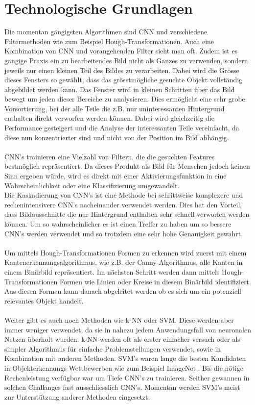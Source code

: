 \section{Technologische Grundlagen}
\label{sec:technicalBase}
Die momentan gängigsten Algorithmen sind \gls{CNN} \parencite{li2015convolutional} und verschiedene Filtermethoden wie zum Beispiel Hough-Transformationen\parencite{ye2015new}. Auch eine Kombination von \gls{CNN} und vorangehenden Filter sieht man oft. Zudem ist es gängige Praxis ein zu bearbeitendes Bild nicht als Ganzes zu verwenden, sondern jeweils nur einen kleinen Teil des Bildes zu verarbeiten. Dabei wird die Grösse dieses Fensters so gewählt, dass das grösstmögliche gesuchte Objekt vollständig abgebildet werden kann. Das Fenster wird in kleinen Schritten über das Bild bewegt um jeden dieser Bereiche zu analysieren. Dies ermöglicht eine sehr grobe Vorsortierung, bei der alle Teile die z.B. nur uninteressanten Hintergrund enthalten direkt verworfen werden können. Dabei wird gleichzeitig die Performance gesteigert und die Analyse der interessanten Teile vereinfacht, da diese nun konzentrierter sind und nicht von der Position im Bild abhängig.\\
\\
\gls{CNN}’s trainieren eine Vielzahl von Filtern, die die gesuchten Features bestmöglich repräsentiert. Da dieses Produkt als Bild für Menschen jedoch keinen Sinn ergeben würde, wird es direkt mit einer Aktivierungsfunktion in eine Wahrscheinlichkeit oder eine Klassifizierung umgewandelt.\\
Die Kaskadierung von \gls{CNN}’s ist eine Methode bei schrittweise komplexere und rechenintensivere \gls{CNN}’s nacheinander verwendet werden. Dies hat den Vorteil, dass Bildausschnitte die nur Hintergrund enthalten sehr schnell verworfen werden können. Um so wahrscheinlicher es ist einen Treffer zu haben um so bessere \gls{CNN}’s werden verwendet und so trotzdem eine sehr hohe Genauigkeit gewahrt.\\
\\
Um mittels Hough-Transformationen Formen zu erkennen wird zuerst mit einem Kantenerkennungsalgorithmus, wie z.B. der Canny-Algorithmus, alle Kanten in einem Binärbild repräsentiert. Im nächsten Schritt werden dann mittels Hough-Transformationen Formen wie Linien oder Kreise in diesem Binärbild identifiziert. Aus diesen Formen kann danach abgeleitet werden ob es sich um ein potenziell relevantes Objekt handelt.\\
\\
Weiter gibt es auch noch Methoden wie \gls{k-NN} oder \gls{SVM}. Diese werden aber immer weniger verwendet, da sie in nahezu jedem Anwendungsfall von neuronalen Netzen überholt wurden. \gls{k-NN} werden oft als erster einfacher versuch oder als simpler Algorithmus für einfache Problemstellungen verwendet, sowie in Kombination mit anderen Methoden. \gls{SVM}'s waren lange die besten Kandidaten in Objekterkennungs-Wettbewerben wie zum Beispiel ImageNet \parencite{ILSVRC15}. Bis die nötige Rechenleistung verfügbar war um Tiefe \gls{CNN}'s zu trainieren. Seither gewannen in solchen Challanges fast ausschliesslich \gls{CNN}'s. Momentan werden \gls{SVM}'s meist zur Unterstützung anderer Methoden eingesetzt.\\
